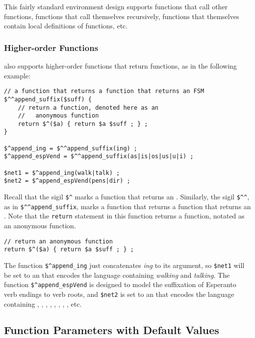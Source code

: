 This fairly standard environment design supports functions that call other
functions, functions that call themselves recursively, functions
that themselves contain local definitions of functions, etc.  

\subsubsection{Higher-order Functions}

\Kleene{} also supports higher-order functions that return functions,
as in the following example:

\begin{Verbatim}
// a function that returns a function that returns an FSM 
$^^append_suffix($suff) {
    // return a function, denoted here as an
    //   anonymous function
    return $^($a) { return $a $suff ; } ;
}

$^append_ing = $^^append_suffix(ing) ;
$^append_espVend = $^^append_suffix(as|is|os|us|u|i) ;

$net1 = $^append_ing(walk|talk) ;
$net2 = $^append_espVend(pens|dir) ;
\end{Verbatim}

\noindent
Recall that the sigil \verb!$^! marks a function that returns an \fsm{}. Similarly,
the sigil \verb!$^^!, as in \verb!$^^append_suffix!, marks a function that returns a function that returns an
\fsm{}.  Note that the \texttt{return} statement in this function returns a function, notated as an anonymous
function.

\begin{Verbatim}
// return an anonymous function
return $^($a) { return $a $suff ; } ;
\end{Verbatim}

The function \verb!$^append_ing! just concatenates \emph{ing} to
its \fsm{} argument, so \verb!$net1! will be set to an \fsm{} that
encodes the language containing \emph{walking} and \emph{talking}.
The function \verb!$^append_espVend! is designed to model the
suffixation of Esperanto verb endings to verb roots, and
\verb!$net2! is set to an \fsm{} that encodes the language
containing , , ,
, , , , , etc.


\subsection{Function Parameters with Default Values}

